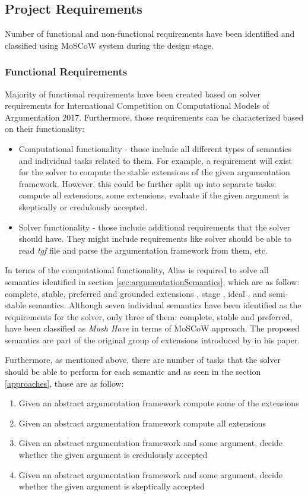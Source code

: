 \subsection{Project Requirements} \label{label:projectRequirements}
Number of functional and non-functional requirements have been identified and classified using MoSCoW system during the design stage. 

\subsubsection{Functional Requirements}
Majority of functional requirements have been created based on solver requirements for International Competition on Computational Models of Argumentation 2017. Furthermore, those requirements can be characterized based on their functionality:
\begin{itemize}
	\item Computational functionality - those include all different types of semantics and individual tasks related to them. For example, a requirement will exist for the solver to compute the stable extensions of the given argumentation framework. However, this could be further split up into separate tasks: compute all extensions, some extensions, evaluate if the given argument is skeptically or credulously accepted.
	\item Solver functionality - those include additional requirements that the solver should have. They might include requirements like solver should be able to read \textit{tgf} file and parse the argumentation framework from them, etc.
\end{itemize}

In terms of the computational functionality, Alias is required to solve all semantics identified in section \ref{sec:argumentationSemantics}, which are as follow: complete, stable, preferred and grounded extensions \citep{dung1995}, stage \citep{verheij1996two}, ideal \citep{dung2007computing}, and semi-stable \citep{caminada2006semi} semantics. Although seven individual semantics have been identified as the requirements for the solver, only three of them: complete, stable and preferred, have been classified as \textit{Mush Have} in terms of MoSCoW approach. The proposed semantics are part of the original group of extensions introduced by \citet{dung1995} in his paper. 

Furthermore, as mentioned above, there are number of tasks that the solver should be able to perform for each semantic and as seen in the section \ref{approaches}, those are as follow:
\begin{enumerate}
	\item Given an abstract argumentation framework compute some of the extensions
	\item Given an abstract argumentation framework compute all extensions
	\item Given an abstract argumentation framework and some argument, decide whether the given argument is credulously accepted
	\item Given an abstract argumentation framework and some argument, decide whether the given argument is skeptically accepted
\end{enumerate}

